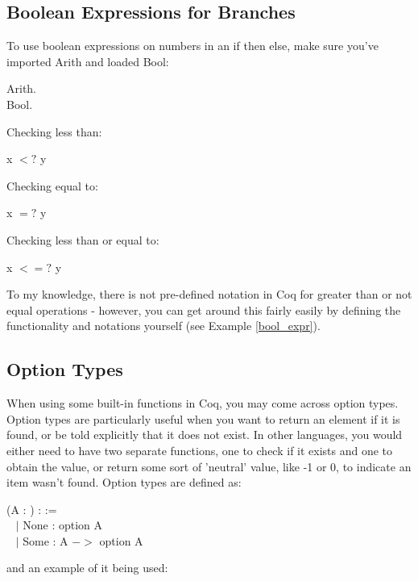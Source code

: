 \subsection{Boolean Expressions for Branches} \label{subsec: bool_expr} 
To use boolean expressions on numbers in an if then else, make sure you've imported Arith and loaded Bool:
\begin{code}
	 Arith.	\\
	\Load Bool.
\end{code}

Checking less than:
\begin{code}
	x $<?$ y 
\end{code}

Checking equal to:
\begin{code}
	x $=?$ y
\end{code}

Checking less than or equal to:
\begin{code}
	x $<=?$ y
\end{code}

\noindent
To my knowledge, there is not pre-defined notation in Coq for greater than or not equal operations - however, you can get around this fairly easily by defining the functionality and notations yourself  (see Example \ref{bool_expr}).






\subsection{Option Types} \label{subsec: opt_ty}
When using some built-in functions in Coq, you may come across option types. 
Option types are particularly useful when you want to return an element if it is found, or be told explicitly that it does not exist.
In other languages, you would either need to have two separate functions, one to check if it exists and one to obtain the value, or return some sort of 'neutral' value, like -1 or 0, to indicate an item wasn't found.
Option types are defined as: 

\begin{code} 
	\Inductive {} (A : \Type) : \Type :=	\\ \-\ \quad
	$\mid$ None : option A					\\ \-\ \quad
	$\mid$ Some : A $->$ option A
\end{code}

and an example of it being used:

